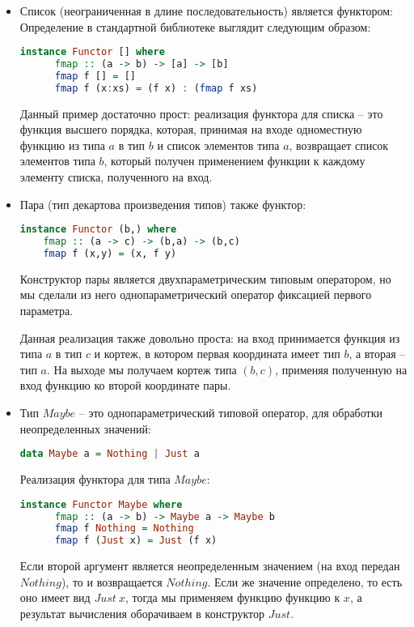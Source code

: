 \begin{itemize}
  \item Список (неограниченная в длине последовательность) является функтором:
  Определение в стандартной
  библиотеке выглядит следующим образом:

  \begin{lstlisting}[language=Haskell]
    instance Functor [] where
      fmap :: (a -> b) -> [a] -> [b]
      fmap f [] = []
      fmap f (x:xs) = (f x) : (fmap f xs)
  \end{lstlisting}

  Данный пример достаточно прост: реализация функтора для списка -- это функция высшего порядка, которая,
  принимая на входе одноместную функцию из типа $a$ в тип $b$ и список элементов типа $a$, возвращает список элементов типа $b$, который
  получен применением функции к каждому элементу списка, полученного на вход.
  \item Пара (тип декартова произведения типов) также функтор:
  \begin{lstlisting}[language=Haskell]
  instance Functor (b,) where
    fmap :: (a -> c) -> (b,a) -> (b,c)
    fmap f (x,y) = (x, f y)
  \end{lstlisting}

  Конструктор пары является двухпараметрическим типовым оператором, но мы сделали из него однопараметрический оператор фиксацией первого параметра.

  Данная реализация также довольно проста: на вход принимается функция из типа $a$ в тип $c$ и кортеж, в котором первая координата имеет тип $b$, а вторая -- тип $a$.
  На выходе мы получаем кортеж типа $(b,c)$, применяя полученную на вход функцию ко второй координате пары.

  \item Тип $Maybe$ -- это однопараметрический типовой оператор, для обработки неопределенных значений:
  \begin{lstlisting}[language=Haskell]
    data Maybe a = Nothing | Just a
  \end{lstlisting}

  Реализация функтора для типа $Maybe$:
  \begin{lstlisting}[language=Haskell]
    instance Functor Maybe where
      fmap :: (a -> b) -> Maybe a -> Maybe b
      fmap f Nothing = Nothing
      fmap f (Just x) = Just (f x)
  \end{lstlisting}

  Если второй аргумент является неопределенным значением (на вход передан $Nothing$), то и возвращается $Nothing$. Если же значение определено, то есть оно имеет вид $Just \: x$, тогда
  мы применяем функцию функцию к $x$, а результат вычисления оборачиваем в конструктор $Just$.
\end{itemize}

